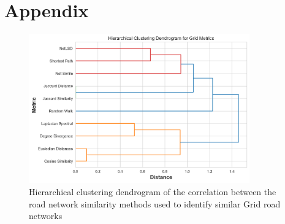 
\section{Appendix}

\begin{figure}[!ht]
\centering
\includegraphics[width=0.85\textwidth,center]{picture/Grid/grid_metrics_dendrogram.png}
\caption[Hierarchical Clustering Dendrogram of the Correlation between the Road Network Similarity Methods for Grid Road Networks]{Hierarchical clustering dendrogram of the correlation between the road network similarity methods used to identify similar Grid road networks}
\label{fig:Hierarchical Clustering Dendrogram of the Correlation between the Road Network Similarity Methods for Grid Road Networks}
\end{figure}
